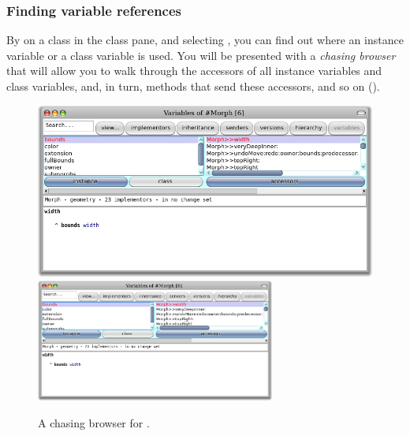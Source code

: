 \documentclass[a4paper,10pt,twoside]{book}
\begin{document}
\subsubsection{Finding variable references}

By  on a class in the class pane, and selecting , you can find out where an instance variable or a class variable is used.
You will be presented with a \emph{chasing browser} that will allow you to walk through the accessors of all instance variables and class variables, and, in turn, methods that send these accessors, and so on ().

\begin{figure}[btp]
	\begin{center}
	\ifluluelse
		{\includegraphics[width=\textwidth]{chasingBrowser}}
		{\includegraphics[width=0.7\textwidth]{chasingBrowser}}
	\end{center}
	\caption{A chasing browser for .}
\end{figure}

\end{document}

